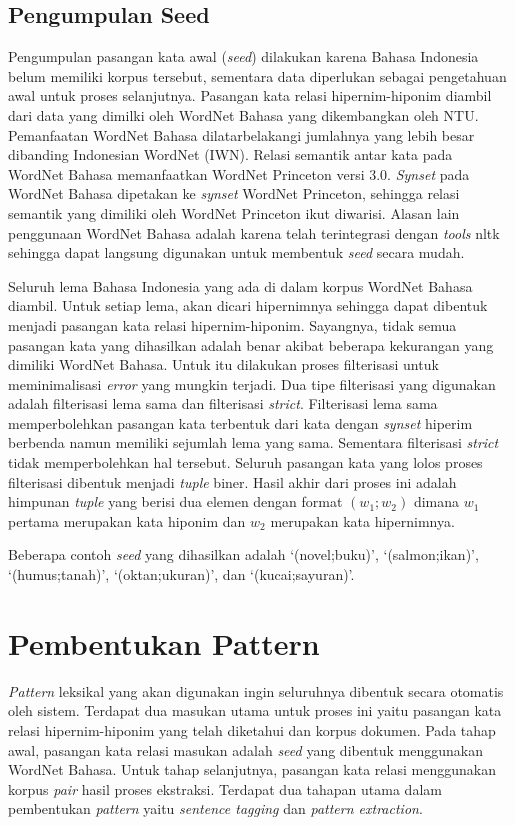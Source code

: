 \subsection{Pengumpulan Seed}
Pengumpulan pasangan kata awal (\textit{seed}) dilakukan karena Bahasa Indonesia belum memiliki korpus tersebut, sementara data diperlukan sebagai pengetahuan awal untuk proses selanjutnya. Pasangan kata relasi hipernim-hiponim diambil dari data yang dimilki oleh WordNet Bahasa yang dikembangkan oleh NTU. Pemanfaatan WordNet Bahasa dilatarbelakangi jumlahnya yang lebih besar dibanding Indonesian WordNet (IWN). Relasi semantik antar kata pada WordNet Bahasa memanfaatkan WordNet Princeton versi 3.0. \textit{Synset} pada WordNet Bahasa dipetakan ke \textit{synset} WordNet Princeton, sehingga relasi semantik yang dimiliki oleh WordNet Princeton ikut diwarisi. Alasan lain penggunaan WordNet Bahasa adalah karena telah terintegrasi dengan \textit{tools} nltk sehingga dapat langsung digunakan untuk membentuk \textit{seed} secara mudah.

Seluruh lema Bahasa Indonesia yang ada di dalam korpus WordNet Bahasa diambil. Untuk setiap lema, akan dicari hipernimnya sehingga dapat dibentuk menjadi pasangan kata relasi hipernim-hiponim. Sayangnya, tidak semua pasangan kata yang dihasilkan adalah benar akibat beberapa kekurangan yang dimiliki WordNet Bahasa. Untuk itu dilakukan proses filterisasi untuk meminimalisasi \textit{error} yang mungkin terjadi. Dua tipe filterisasi yang digunakan adalah filterisasi lema sama dan filterisasi \textit{strict}. Filterisasi lema sama memperbolehkan pasangan kata terbentuk dari kata dengan \textit{synset} hiperim berbenda namun memiliki sejumlah lema yang sama. Sementara filterisasi \textit{strict} tidak memperbolehkan hal tersebut. Seluruh pasangan kata yang lolos proses filterisasi dibentuk menjadi \textit{tuple} biner. Hasil akhir dari proses ini adalah himpunan \textit{tuple} yang berisi dua elemen dengan format $(w_1;w_2)$ dimana $w_1$ pertama merupakan kata hiponim dan $w_2$ merupakan kata hipernimnya.

Beberapa contoh \textit{seed} yang dihasilkan adalah `(novel;buku)', `(salmon;ikan)', `(humus;tanah)', `(oktan;ukuran)', dan `(kucai;sayuran)'.


\section{Pembentukan Pattern}
\textit{Pattern} leksikal yang akan digunakan ingin seluruhnya dibentuk secara otomatis oleh sistem. Terdapat dua masukan utama untuk proses ini yaitu pasangan kata relasi hipernim-hiponim yang telah diketahui dan korpus dokumen. Pada tahap awal, pasangan kata relasi masukan adalah \textit{seed} yang dibentuk menggunakan WordNet Bahasa. Untuk tahap selanjutnya, pasangan kata relasi menggunakan korpus \textit{pair} hasil proses ekstraksi. Terdapat dua tahapan utama dalam pembentukan \textit{pattern} yaitu \textit{sentence tagging} dan \textit{pattern extraction}.

